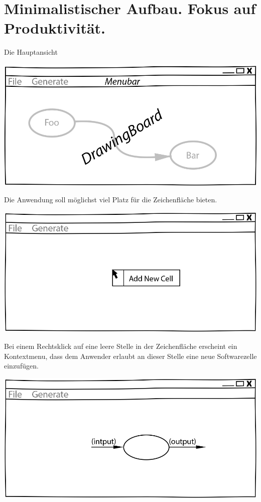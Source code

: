 \section{Minimalistischer Aufbau. Fokus auf Produktivität.}


Die Hauptansicht

\includegraphics[width=.9\linewidth]{./img/MainCrop.jpg}

Die Anwendung soll möglichst viel Platz für die Zeichenfläche
bieten.

\includegraphics[width=.9\linewidth]{./img/ContextMenu.jpg}

Bei einem Rechtsklick auf eine leere Stelle in der Zeichenfläche erscheint ein
Kontextmenu, dass dem Anwender erlaubt an dieser Stelle eine neue Softwarezelle einzufügen.

\includegraphics[width=.9\linewidth]{./img/NewCell.jpg}

